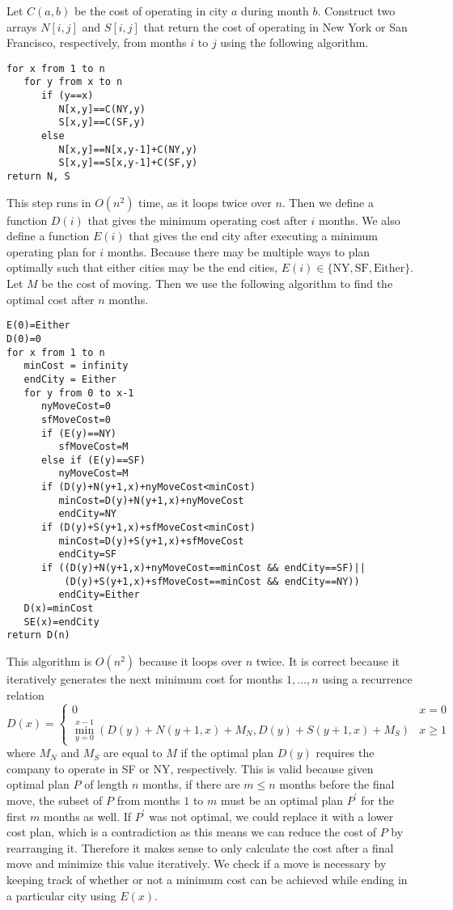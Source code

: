 \documentclass[12pt]{article}
\begin{document}
Let \(C(a,b)\) be the cost of operating in city \(a\) during month \(b\). Construct two arrays \(N[i,j]\) and \(S[i,j]\)
that return the cost of operating in New York or San Francisco, respectively, from months \(i\) to \(j\) using the following algorithm.
\begin{verbatim}
for x from 1 to n
   for y from x to n
      if (y==x)
         N[x,y]==C(NY,y)
         S[x,y]==C(SF,y)
      else
         N[x,y]==N[x,y-1]+C(NY,y)
         S[x,y]==S[x,y-1]+C(SF,y)
return N, S
\end{verbatim}
This step runs in \(O(n^2)\) time, as it loops twice over \(n\). Then we define a function \(D(i)\) that gives the minimum operating cost
after \(i\) months. We also define a function \(E(i)\) that gives the end city after executing a minimum operating plan for \(i\) months.
Because there may be multiple ways to plan optimally such that either cities may be the end cities,
\(E(i)\in\{\text{NY},\text{SF},\text{Either}\}\). Let \(M\) be the cost of moving. Then we use the following algorithm to find the
optimal cost after \(n\) months.
\begin{verbatim}
E(0)=Either
D(0)=0
for x from 1 to n
   minCost = infinity
   endCity = Either
   for y from 0 to x-1
      nyMoveCost=0
      sfMoveCost=0
      if (E(y)==NY)
         sfMoveCost=M
      else if (E(y)==SF)
         nyMoveCost=M
      if (D(y)+N(y+1,x)+nyMoveCost<minCost)
         minCost=D(y)+N(y+1,x)+nyMoveCost
         endCity=NY
      if (D(y)+S(y+1,x)+sfMoveCost<minCost)
         minCost=D(y)+S(y+1,x)+sfMoveCost
         endCity=SF
      if ((D(y)+N(y+1,x)+nyMoveCost==minCost && endCity==SF)||
          (D(y)+S(y+1,x)+sfMoveCost==minCost && endCity==NY))
         endCity=Either
   D(x)=minCost
   SE(x)=endCity
return D(n)
\end{verbatim}
This algorithm is \(O(n^2)\) because it loops over \(n\) twice. It is correct because it iteratively generates the next minimum cost for months \(1,\ldots,n\)
using a recurrence relation
\[D(x)=\begin{cases} 0 & x=0\\ \min\limits_{y=0}^{x-1} (D(y)+N(y+1,x)+M_N,D(y)+S(y+1,x)+M_S) & x\geq1 \end{cases}\]
where \(M_N\) and \(M_S\) are equal to \(M\) if the optimal plan \(D(y)\) requires the company to operate in SF or NY, respectively. This is valid because given
optimal plan \(P\) of length \(n\) months, if there are \(m\leq n\) months before the final move, the subset of \(P\) from months \(1\) to \(m\) must be an
optimal plan \(P^\prime\) for the first \(m\) months as well. If \(P^\prime\) was not optimal, we could replace it with a lower cost plan, which is a contradiction
as this means we can reduce the cost of \(P\) by rearranging it. Therefore it makes sense to only calculate the cost after a final move and minimize this value iteratively.
We check if a move is necessary by keeping track of whether or not a minimum cost can be achieved while ending in a particular city using \(E(x)\).
\end{document}
